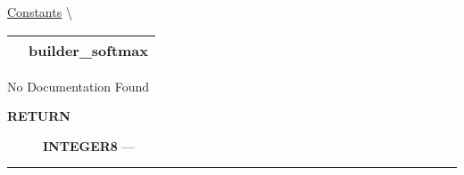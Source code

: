 \hypertarget{ecldoc:logisticregression.constants.builder_softmax}{}
\hspace{0pt} \hyperlink{ecldoc:LogisticRegression.Constants}{Constants} \textbackslash 

{\renewcommand{\arraystretch}{1.5}
\begin{tabularx}{\textwidth}{|>{\raggedright\arraybackslash}l|X|}
\hline
\hspace{0pt}\mytexttt{\color{red} } & \textbf{builder\_softmax} \\
\hline
\end{tabularx}
}

\par





No Documentation Found








\par
\begin{description}
\item [\colorbox{tagtype}{\color{white} \textbf{\textsf{RETURN}}}] \textbf{INTEGER8} --- 
\end{description}




\rule{\linewidth}{0.5pt}


